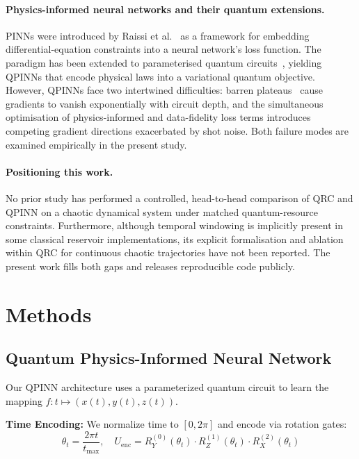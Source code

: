 \documentclass[11pt,a4paper]{article}
\begin{document}
\paragraph{Physics-informed neural networks and their quantum extensions.}
PINNs were introduced by Raissi et al.~\cite{raissi2019} as a framework for
embedding differential-equation constraints into a neural network's loss
function.
The paradigm has been extended to parameterised quantum circuits~\cite{qcpinn2024},
yielding QPINNs that encode physical laws into a variational quantum objective.
However, QPINNs face two intertwined difficulties: barren
plateaus~\cite{mcclean2018} cause gradients to vanish exponentially with circuit
depth, and the simultaneous optimisation of physics-informed and data-fidelity
loss terms introduces competing gradient directions exacerbated by shot noise.
Both failure modes are examined empirically in the present study.

\paragraph{Positioning this work.}
No prior study has performed a controlled, head-to-head comparison of QRC and
QPINN on a chaotic dynamical system under matched quantum-resource constraints.
Furthermore, although temporal windowing is implicitly present in some classical
reservoir implementations, its explicit formalisation and ablation within QRC
for continuous chaotic trajectories have not been reported.
The present work fills both gaps and releases reproducible code publicly.

\section{Methods}

\subsection{Quantum Physics-Informed Neural Network}

Our QPINN architecture uses a parameterized quantum circuit to learn the mapping $f: t \mapsto (x(t), y(t), z(t))$.

\textbf{Time Encoding:} We normalize time to $[0, 2\pi]$ and encode via rotation gates:
\begin{equation}
    \theta_t = \frac{2\pi t}{t_{\max}}, \quad U_{\text{enc}} = R_Y^{(0)}(\theta_t) \cdot R_Z^{(1)}(\theta_t) \cdot R_X^{(2)}(\theta_t)
\end{equation}
\end{document}
